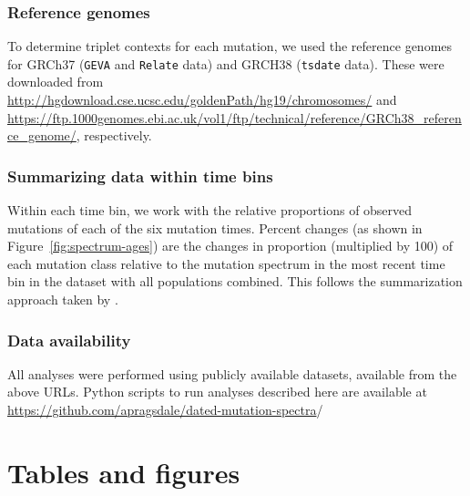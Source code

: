 \documentclass[]{article}
\newcommand{\GEVA}{\texttt{GEVA}\xspace}
\newcommand{\tsdate}{\texttt{tsdate}\xspace}
\newcommand{\relate}{\texttt{Relate}\xspace}
\begin{document}
\subsubsection*{Reference genomes} To determine triplet contexts for each
mutation, we used the reference genomes for GRCh37 (\GEVA and \relate data) and
GRCH38 (\tsdate data). These were downloaded from
\url{http://hgdownload.cse.ucsc.edu/goldenPath/hg19/chromosomes/} and
\url{https://ftp.1000genomes.ebi.ac.uk/vol1/ftp/technical/reference/GRCh38_reference_genome/},
respectively.

\subsubsection*{Summarizing data within time bins}

Within each time bin, we work with the relative proportions of observed
mutations of each of the six mutation times. Percent changes (as shown in
Figure~\ref{fig:spectrum-ages}) are the changes in proportion (multiplied
by 100) of each mutation class relative to the mutation spectrum in the
most recent time bin in the dataset with all populations combined. This
follows the summarization approach taken by \citet{wang2023human}.

\subsubsection*{Data availability}

All analyses were performed using publicly available datasets, available from
the above URLs. Python scripts to run analyses described here are available at
\url{https://github.com/apragsdale/dated-mutation-spectra}/




\clearpage

\section*{Tables and figures}
\end{document}
